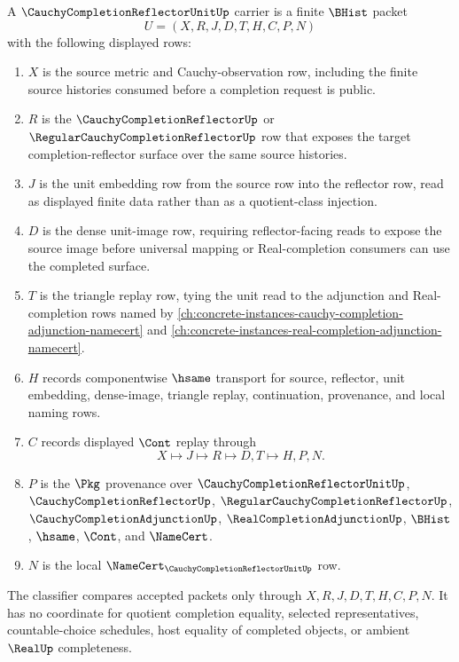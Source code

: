 \begin{definition}
\label{def:cauchy-completion-reflector-unit-carrier}
A $\CauchyCompletionReflectorUnitUp$ carrier is a finite $\BHist$ packet
$$
U=(X,R,J,D,T,H,C,P,N)
$$
with the following displayed rows:
\begin{enumerate}
\item $X$ is the source metric and Cauchy-observation row, including the finite source histories consumed before a completion request is public.
\item $R$ is the $\CauchyCompletionReflectorUp$ or $\RegularCauchyCompletionReflectorUp$ row that exposes the target completion-reflector surface over the same source histories.
\item $J$ is the unit embedding row from the source row into the reflector row, read as displayed finite data rather than as a quotient-class injection.
\item $D$ is the dense unit-image row, requiring reflector-facing reads to expose the source image before universal mapping or Real-completion consumers can use the completed surface.
\item $T$ is the triangle replay row, tying the unit read to the adjunction and Real-completion rows named by \autoref{ch:concrete-instances-cauchy-completion-adjunction-namecert} and \autoref{ch:concrete-instances-real-completion-adjunction-namecert}.
\item $H$ records componentwise $\hsame$ transport for source, reflector, unit embedding, dense-image, triangle replay, continuation, provenance, and local naming rows.
\item $C$ records displayed $\Cont$ replay through
$$
X\longmapsto J\longmapsto R\longmapsto D,T\longmapsto H,P,N .
$$
\item $P$ is the $\Pkg$ provenance over $\CauchyCompletionReflectorUnitUp$, $\CauchyCompletionReflectorUp$, $\RegularCauchyCompletionReflectorUp$, $\CauchyCompletionAdjunctionUp$, $\RealCompletionAdjunctionUp$, $\BHist$, $\hsame$, $\Cont$, and $\NameCert$.
\item $N$ is the local $\NameCert_{\CauchyCompletionReflectorUnitUp}$ row.
\end{enumerate}
The classifier compares accepted packets only through $X,R,J,D,T,H,C,P,N$. It has no coordinate for quotient completion equality, selected representatives, countable-choice schedules, host equality of completed objects, or ambient $\RealUp$ completeness.
\end{definition}

